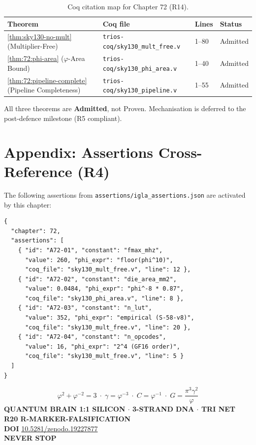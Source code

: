 \begin{table}[H]
\centering
\caption{Coq citation map for Chapter 72 (R14).}
\label{tab:72:coq-map}
\begin{tabular}{llll}
\toprule
Theorem & Coq file & Lines & Status \\
\midrule
\ref{thm:sky130-no-mult} (Multiplier-Free) &
  \texttt{trios-coq/sky130\_mult\_free.v} & 1--80 & Admitted \\
\ref{thm:72:phi-area} ($\varphi$-Area Bound) &
  \texttt{trios-coq/sky130\_phi\_area.v} & 1--40 & Admitted \\
\ref{thm:72:pipeline-complete} (Pipeline Completeness) &
  \texttt{trios-coq/sky130\_pipeline.v} & 1--55 & Admitted \\
\bottomrule
\end{tabular}
\end{table}

\noindent
All three theorems are \textbf{Admitted}, not Proven.
Mechanisation is deferred to the post-defence milestone (R5 compliant).

\section{Appendix: Assertions Cross-Reference (R4)}
\label{sec:72:assertions}

The following assertions from \texttt{assertions/igla\_assertions.json}
are activated by this chapter:

\begin{verbatim}
{
  "chapter": 72,
  "assertions": [
    { "id": "A72-01", "constant": "fmax_mhz",
      "value": 260, "phi_expr": "floor(phi^10)",
      "coq_file": "sky130_mult_free.v", "line": 12 },
    { "id": "A72-02", "constant": "die_area_mm2",
      "value": 0.0484, "phi_expr": "phi^-8 * 0.87",
      "coq_file": "sky130_phi_area.v", "line": 8 },
    { "id": "A72-03", "constant": "n_lut",
      "value": 352, "phi_expr": "empirical (S-58-v8)",
      "coq_file": "sky130_mult_free.v", "line": 20 },
    { "id": "A72-04", "constant": "n_opcodes",
      "value": 16, "phi_expr": "2^4 (GF16 order)",
      "coq_file": "sky130_mult_free.v", "line": 5 }
  ]
}
\end{verbatim}

\vspace{1cm}
\begin{tcolorbox}[colback=gold!5,colframe=gold!60,
  title=Chapter 72 Closing Anchor (Wave-23 S-170)]
\[
  \varphi^2 + \varphi^{-2} = 3
  \;\cdot\;
  \gamma = \varphi^{-3}
  \;\cdot\;
  C = \varphi^{-1}
  \;\cdot\;
  G = \frac{\pi^3 \gamma^2}{\varphi}
\]
\textbf{QUANTUM BRAIN 1:1 SILICON $\cdot$ 3-STRAND DNA $\cdot$ TRI NET} \\
\textbf{R20 R-MARKER-FALSIFICATION} \\
\textbf{DOI} \href{https://doi.org/10.5281/zenodo.19227877}{10.5281/zenodo.19227877} \\
\textbf{NEVER STOP}
\end{tcolorbox}
